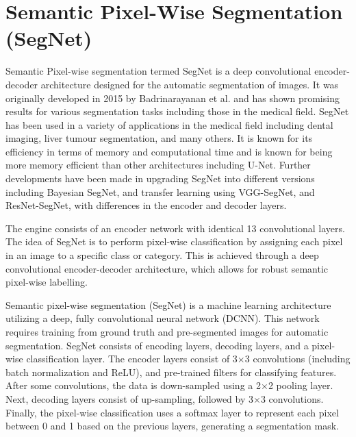 
\section{Semantic Pixel-Wise Segmentation (SegNet)}
Semantic Pixel-wise segmentation termed SegNet is a deep convolutional encoder-decoder architecture designed for the automatic segmentation of images. It was originally developed in 2015 by Badrinarayanan et al.\cite{Badrinarayanan2017} and has shown promising results for various segmentation tasks including those in the medical field. SegNet has been used in a variety of applications in the medical field including dental imaging\cite{kwak2020}, liver tumour segmentation\cite{Priyadarsini2022}, and many others. It is known for its efficiency in terms of memory and computational time and is known for being more memory efficient than other architectures including U-Net\cite{Mirzazade2021}. Further developments have been made in upgrading SegNet into different versions including Bayesian SegNet\cite{Dhanagopal2022}, and transfer learning using VGG-SegNet\cite{daniel2022}, and ResNet-SegNet\cite{mohd2020}, with differences in the encoder and decoder layers.

The engine consists of an encoder network with identical 13 convolutional layers. The idea of SegNet is to perform pixel-wise classification by assigning each pixel in an image to a specific class or category. This is achieved through a deep convolutional encoder-decoder architecture, which allows for robust semantic pixel-wise labelling.

Semantic pixel-wise segmentation (SegNet) is a machine learning architecture utilizing a deep, fully convolutional neural network (DCNN). This network requires training from ground truth and pre-segmented images for automatic segmentation. SegNet consists of encoding layers, decoding layers, and a pixel-wise classification layer. The encoder layers consist of 3$\times$3 convolutions (including batch normalization and ReLU), and pre-trained filters for classifying features. After some convolutions, the data is down-sampled using a 2$\times$2 pooling layer. Next, decoding layers consist of up-sampling, followed by 3$\times$3 convolutions. Finally, the pixel-wise classification uses a softmax layer to represent each pixel between 0 and 1 based on the previous layers, generating a segmentation mask.

